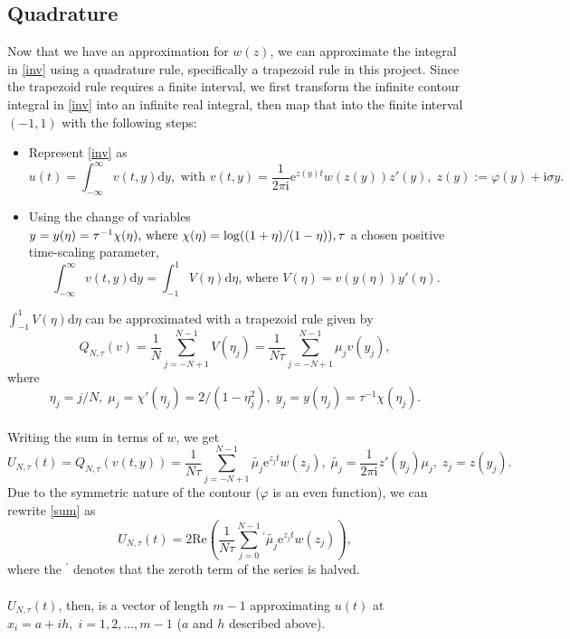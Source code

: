 \documentclass[letterpaper, 12pt]{article}
\def\e{\text{e}}
\def\i{\text{i}}
\def\d{\text{d}}
\begin{document}
		\subsection*{Quadrature}
		Now that we have an approximation for $w(z)$, we can approximate the integral in \eqref{inv} using a quadrature rule, specifically a trapezoid rule in this project. Since the trapezoid rule requires a finite interval, we first transform the infinite contour integral in \eqref{inv} into an infinite real integral, then map that into the finite interval $(-1,1)$ with the following steps:
		\begin{itemize}
		\renewcommand{\labelitemi}{--}
			\item Represent \eqref{inv} as
			$$u(t)=\int_{-\infty}^\infty v(t,y)\d y,\text{ with }v(t,y)=\frac{1}{2\pi\i}\e^{z(y)t}w(z(y))z'(y),\;z(y):=\varphi(y)+\i\sigma y.$$
			\item Using the change of variables $y=y(\eta)=\tau^{-1}\chi(\eta)\text{, where }\chi(\eta)=\log((1+\eta)/(1-\eta)),\\\tau$ a chosen positive time-scaling parameter, 
			$$\int_{-\infty}^\infty v(t,y)\d y=\int_{-1}^1V(\eta)\d\eta\text{, where }V(\eta)=v(y(\eta))y'(\eta).$$  
		\end{itemize}
		$\displaystyle \int_{-1}^1V(\eta)\d\eta$ can be approximated with a trapezoid rule given by
		$$Q_{N,\tau}(v)=\frac{1}{N}\sum_{j=-N+1}^{N-1}V(\eta_j)=\frac{1}{N\tau}\sum_{j=-N+1}^{N-1}\mu_jv(y_j),$$
		where
		$$\eta_j=j/N,\;\mu_j=\chi'(\eta_j)=2/(1-\eta_j^2),\;y_j=y(\eta_j)=\tau^{-1}\chi(\eta_j).$$\\
		Writing the sum in terms of $w$, we get
		\begin{equation}\label{sum}
			U_{N,\tau}(t)=Q_{N,\tau}(v(t,y))=\frac{1}{N\tau}\sum_{j=-N+1}^{N-1}\tilde{\mu_j}\e^{z_jt}w(z_j),\;\tilde{\mu_j}=\frac{1}{2\pi\i}z'(y_j)\mu_j,\;z_j=z(y_j).
		\end{equation}
		Due to the symmetric nature of the contour ($\varphi$ is an even function), we can rewrite \eqref{sum} as
		$$U_{N,\tau}(t)=2\text{Re}\left(\frac{1}{N\tau}\sum_{j=0}^{N-1}{}^\prime \tilde{\mu_j}\e^{z_jt}w(z_j)\right),$$
		where the ${}^\prime$ denotes that the zeroth term of the series is halved. \\\\
		$U_{N,\tau}(t)$, then, is a vector of length $m-1$ approximating $u(t)$ at $x_i=a+ih,\;i=1,2,...,m-1$ ($a$ and $h$ described above).
		
\end{document}
